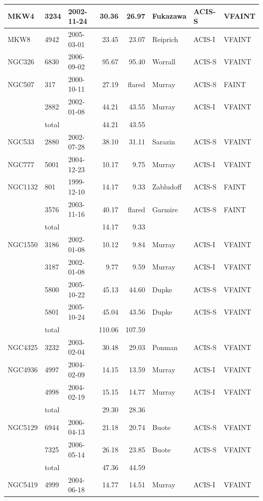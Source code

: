 \documentclass[structabstract]{aa}
\begin{document}
\begin{table}[!h]
\begin{center}
\begin{tabularx}{\textwidth}{XlXrrXXX}
MKW4 & 3234 & 2002-11-24 & 30.36 & 26.97 & Fukazawa & ACIS-S & VFAINT \\ \hline
MKW8 & 4942 & 2005-03-01 & 23.45 & 23.07 & Reiprich & ACIS-I & VFAINT \\ \hline
NGC326 & 6830 & 2006-09-02 & 95.67 & 95.40 & Worrall & ACIS-S & VFAINT \\ \hline
NGC507 & 317 & 2000-10-11 & 27.19 & flared & Murray & ACIS-S & FAINT \\ \hline
 & 2882 & 2002-01-08 & 44.21 & 43.55 & Murray & ACIS-I & VFAINT \\ 
 & total &  & 44.21 & 43.55 &  &  &  \\ \hline
NGC533 & 2880 & 2002-07-28 & 38.10 & 31.11 & Sarazin & ACIS-S & VFAINT \\ \hline
NGC777 & 5001 & 2004-12-23 & 10.17 & 9.75 & Murray & ACIS-I & VFAINT \\ \hline
NGC1132 & 801 & 1999-12-10 & 14.17 & 9.33 & Zabludoff & ACIS-S & FAINT \\ \hline
 & 3576 & 2003-11-16 & 40.17 & flared & Garmire & ACIS-S & FAINT \\ 
 & total &  & 14.17 & 9.33 &  &  &  \\ \hline
NGC1550 & 3186 & 2002-01-08 & 10.12 & 9.84 & Murray & ACIS-I & VFAINT \\ 
 & 3187 & 2002-01-08 & 9.77 & 9.59 & Murray & ACIS-I & VFAINT \\ 
 & 5800 & 2005-10-22 & 45.13 & 44.60 & Dupke & ACIS-S & VFAINT \\ 
 & 5801 & 2005-10-24 & 45.04 & 43.56 & Dupke & ACIS-S & VFAINT \\ 
 & total &  & 110.06 & 107.59 &  &  &  \\ \hline
NGC4325 & 3232 & 2003-02-04 & 30.48 & 29.03 & Ponman & ACIS-S & VFAINT \\ \hline
NGC4936 & 4997 & 2004-02-09 & 14.15 & 13.59 & Murray & ACIS-I & VFAINT \\ 
 & 4998 & 2004-02-19 & 15.15 & 14.77 & Murray & ACIS-I & VFAINT \\ 
 & total &  & 29.30 & 28.36 &  &  &  \\ \hline
NGC5129 & 6944 & 2006-04-13 & 21.18 & 20.74 & Buote & ACIS-S & VFAINT \\ 
 & 7325 & 2006-05-14 & 26.18 & 23.85 & Buote & ACIS-S & VFAINT \\ 
 & total &  & 47.36 & 44.59 &  &  &  \\ \hline
NGC5419 & 4999 & 2004-06-18 & 14.77 & 14.51 & Murray & ACIS-I & VFAINT \\ 

\end{tabularx}
\end{center}
\end{table}
\end{document}
